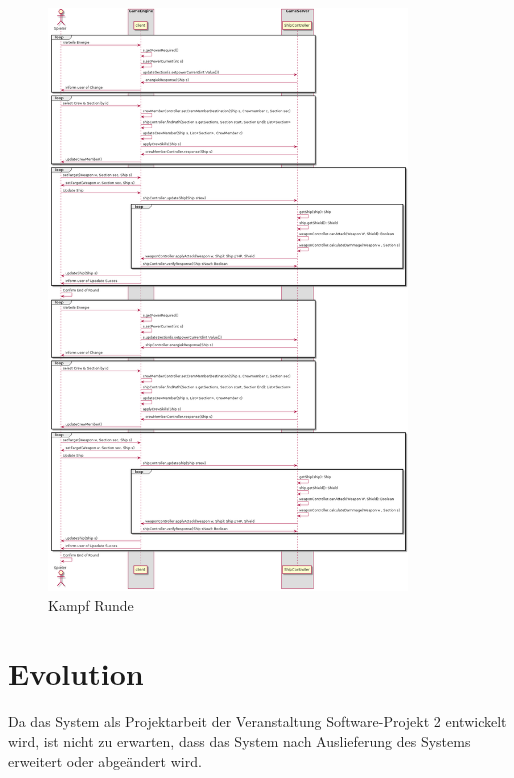 \documentclass[fontsize=12pt,paper=a4,twoside]{scrartcl}
\begin{document}
\begin{figure}[!ht]
	\centering
  \includegraphics[width=0.85\textwidth]{pics/kampf}
	\caption{Kampf Runde}
	\label{fig:Kampf}
\end{figure}

\section{Evolution} \label{sec:evolution}

Da das System als Projektarbeit der Veranstaltung Software-Projekt 2 entwickelt wird,
ist nicht zu erwarten, dass das System nach Auslieferung des Systems erweitert oder abgeändert wird.
\end{document}
